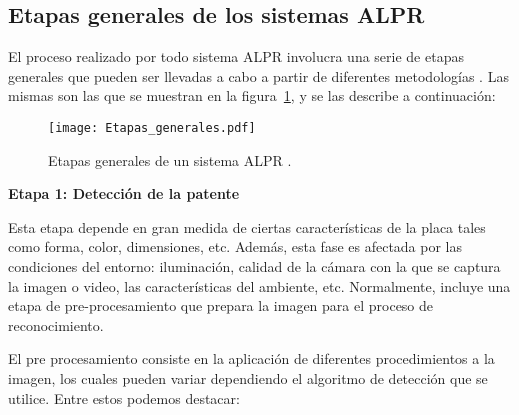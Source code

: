 

\subsection{Etapas generales de los sistemas ALPR} \label{key:etapasgenerales}
El proceso realizado por todo sistema ALPR involucra una serie de etapas generales que pueden ser llevadas a cabo a partir de diferentes metodologías \cite{TRA-147} \cite{LicensePlates2018} \cite{UCC4791_01}. Las mismas son las que se muestran en la figura~\ref{fig:Et_gen}, y se las describe a continuación:

\begin{figure}[H]
	\centering
	\texttt{[image: Etapas\_generales.pdf]}
	\caption{Etapas generales de un sistema ALPR \cite{LicensePlates2018}.}
	\label{fig:Et_gen}
\end{figure} 

\noindent \textbf{Etapa 1: Detección de la patente}

Esta etapa depende en gran medida de ciertas características de la placa tales como forma, color, dimensiones, etc. Además, esta fase es afectada por las condiciones del entorno: iluminación, calidad de la cámara con la que se captura la imagen o video, las características del ambiente, etc. Normalmente, incluye una etapa de pre-procesamiento que prepara la imagen para el proceso de reconocimiento. 

El pre procesamiento consiste en la aplicación de diferentes procedimientos a la imagen, los cuales pueden variar dependiendo el algoritmo de detección que se utilice. Entre estos podemos destacar: 

